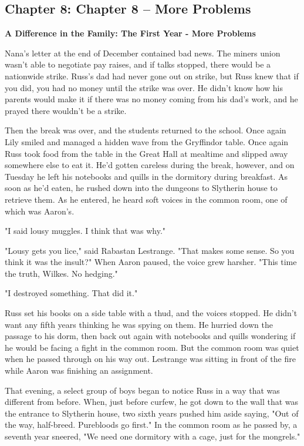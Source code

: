 \documentclass[a4paper,11pt]{article}
\begin{document}
\subsection{Chapter 8: Chapter 8 – More Problems}

\textbf{A Difference in the Family: The First Year - More Problems}

Nana's letter at the end of December contained bad news. The miners union wasn't able to negotiate pay raises, and if talks stopped, there would be a nationwide strike. Russ's dad had never gone out on strike, but Russ knew that if you did, you had no money until the strike was over. He didn't know how his parents would make it if there was no money coming from his dad's work, and he prayed there wouldn't be a strike.

Then the break was over, and the students returned to the school. Once again Lily smiled and managed a hidden wave from the Gryffindor table. Once again Russ took food from the table in the Great Hall at mealtime and slipped away somewhere else to eat it. He'd gotten careless during the break, however, and on Tuesday he left his notebooks and quills in the dormitory during breakfast. As soon as he'd eaten, he rushed down into the dungeons to Slytherin house to retrieve them. As he entered, he heard soft voices in the common room, one of which was Aaron's.

"I said lousy muggles. I think that was why."

"Lousy gets you lice," said Rabastan Lestrange. "That makes some sense. So you think it was the insult?" When Aaron paused, the voice grew harsher. "This time the truth, Wilkes. No hedging."

"I destroyed something. That did it."

Russ set his books on a side table with a thud, and the voices stopped. He didn't want any fifth years thinking he was spying on them. He hurried down the passage to his dorm, then back out again with notebooks and quills wondering if he would be facing a fight in the common room. But the common room was quiet when he passed through on his way out. Lestrange was sitting in front of the fire while Aaron was finishing an assignment.

That evening, a select group of boys began to notice Russ in a way that was different from before. When, just before curfew, he got down to the wall that was the entrance to Slytherin house, two sixth years pushed him aside saying, "Out of the way, half-breed. Purebloods go first." In the common room as he passed by, a seventh year sneered, "We need one dormitory with a cage, just for the mongrels."
\end{document}
